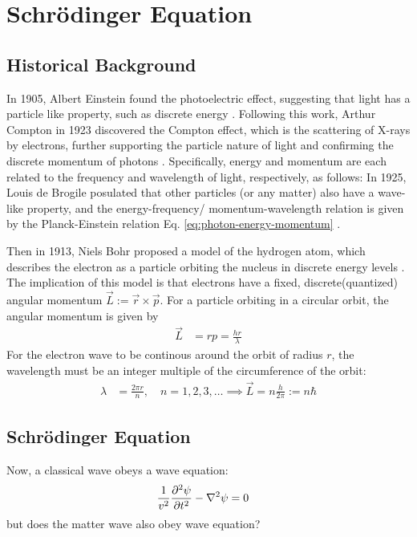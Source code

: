 \newpage
\section{Schrödinger Equation}
\subsection{Historical Background}
In 1905, Albert Einstein found the photoelectric effect, suggesting that light has a particle like property, such as discrete energy
\cite{1905-photoelectric}.
Following this work, Arthur Compton in 1923 discovered the Compton effect, which is the scattering of X-rays by electrons, further supporting the particle nature of light and confirming the discrete momentum of photons
\cite{1923-compton}.
Specifically, energy and momentum are each related to the frequency and wavelength of light, respectively, as follows:
In 1925, Louis de Brogile posulated that other particles (or any matter) also have a wave-like property, and the energy-frequency/ momentum-wavelength relation is given by the Planck-Einstein relation Eq. \eqref{eq:photon-energy-momentum} \cite{1925-deBroglie}.

Then in 1913, Niels Bohr proposed a model of the hydrogen atom, which describes the electron as a particle orbiting the nucleus in discrete energy levels \cite{1913-bohr}.
The implication of this model is that electrons have a fixed, discrete(quantized) angular momentum $\vec{L} := \vec{r} \times \vec{p}$.
For a particle orbiting in a circular orbit, the angular momentum is given by
\begin{align}
  \vec{L} & = r p = \frac{h r}{\lambda}
\end{align}
For the electron wave to be continous around the orbit of radius $r$, the wavelength must be an integer multiple of the circumference of the orbit:
\begin{align}
  \lambda & = \frac{2 \pi r}{n}, \quad n = 1, 2, 3, \ldots \implies \vec{L} = n \frac{h}{2 \pi} := n \hbar
\end{align}

\subsection{Schrödinger Equation}
Now, a classical wave obeys a wave equation:
\begin{align}
  \frac{1}{v^2} \pdv[2]{\psi}{t} - \nabla^2 \psi & = 0
\end{align}
but does the matter wave also obey wave equation?

